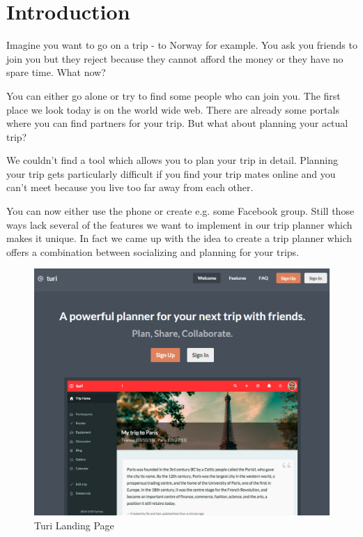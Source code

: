 \documentclass[a4paper]{article}
\begin{document}
\tableofcontents
\pagebreak


\section{Introduction}
Imagine you want to go on a trip - to Norway for example. You ask you friends to join you but they reject because they cannot afford the money or they have no spare time. What now?

You can either go alone or try to find some people who can join you. The first place we look today is on the world wide web. There are already some portals where you can find partners for your trip. But what about planning your actual trip?

We couldn't find a tool which allows you to plan your trip in detail. Planning your trip gets particularly difficult if you find your trip mates online and you can't meet because you live too far away from each other. 

You can now either use the phone or create e.g. some Facebook group. Still those ways lack several of the features we want to implement in our trip planner which makes it unique. In fact we came up with the idea to create a trip planner which offers a combination between socializing and planning for your trips.\\

\begin{figure}[!h]
  \begin{center}
    \includegraphics[width=1\textwidth]{pictures/turi_landing_page.png}
  \end{center}
\caption{Turi Landing Page}
\label{fig:turilandingpage}
\end{figure}
\end{document}
